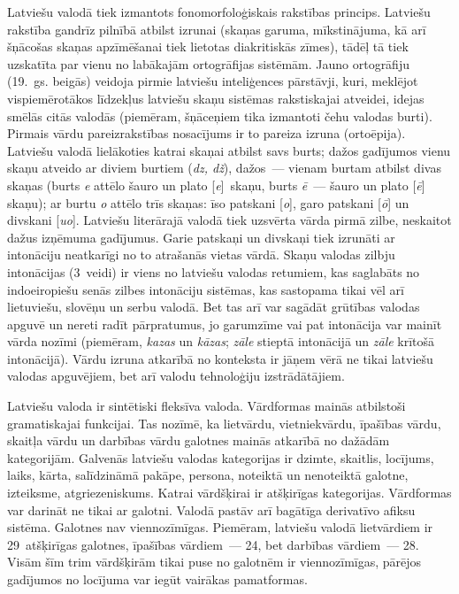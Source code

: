 \begin{multicols}{2}
Latviešu valodā tiek izmantots fonomorfoloģiskais rakstības princips.
Latviešu rakstība gandrīz pilnībā atbilst izrunai (skaņas garuma, mīkstinājuma, kā arī šņācošas skaņas apzīmēšanai tiek lietotas diakritiskās zīmes), tādēļ tā tiek uzskatīta par vienu no labākajām ortogrāfijas sistēmām.
Jauno ortogrāfiju (19.~gs. beigās) veidoja pirmie latviešu inteliģences pārstāvji, kuri, meklējot vispiemērotākos līdzekļus latviešu skaņu sistēmas rakstiskajai atveidei, idejas smēlās citās valodās (piemēram, šņāceņiem tika izmantoti čehu valodas burti).
Pirmais vārdu pareizrakstības nosacījums ir to pareiza izruna (ortoēpija).
Latviešu valodā lielākoties katrai skaņai atbilst savs burts; dažos gadījumos vienu skaņu atveido ar diviem burtiem (\textit{dz, dž}), dažos~--- vienam burtam atbilst divas skaņas (burts \textit{e} attēlo šauro un plato [\textit{e}]~skaņu, burts \textit{ē}~--- šauro un plato [\textit{ē}] skaņu); ar burtu \textit{o} attēlo trīs skaņas: īso patskani [\textit{o}], garo patskani [\textit{ō}] un divskani [\textit{uo}].
Latviešu literārajā valodā tiek uzsvērta vārda pirmā zilbe, neskaitot dažus izņēmuma gadījumus.
Garie patskaņi un divskaņi tiek izrunāti ar intonāciju neatkarīgi no to atrašanās vietas vārdā.
Skaņu valodas zilbju intonācijas (3~veidi) ir viens no latviešu valodas retumiem, kas saglabāts no indoeiropiešu senās zilbes intonāciju sistēmas, kas sastopama tikai vēl arī lietuviešu, slovēņu un serbu valodā.
Bet tas arī var sagādāt grūtības valodas apguvē un nereti radīt pārpratumus, jo garumzīme vai pat intonācija var mainīt vārda nozīmi (piemēram, \textit{kazas} un \textit{kāzas}; \textit{zāle} stieptā intonācijā un \textit{zāle} krītošā intonācijā).
Vārdu izruna atkarībā no konteksta ir jāņem vērā ne tikai latviešu valodas apguvējiem, bet arī valodu tehnoloģiju izstrādātājiem.


Latviešu valoda ir sintētiski fleksīva valoda.
Vārdformas mainās atbilstoši gramatiskajai funkcijai.
Tas nozīmē, ka lietvārdu, vietniekvārdu, īpašības vārdu, skaitļa vārdu un darbības vārdu galotnes mainās atkarībā no dažādām kategorijām.
Galvenās latviešu valodas kategorijas ir dzimte, skaitlis, locījums, laiks, kārta, salīdzināmā pakāpe, persona, noteiktā un nenoteiktā galotne, izteiksme, atgriezeniskums.
Katrai vārdšķirai ir atšķirīgas kategorijas.
Vārdformas var darināt ne tikai ar galotni.
Valodā pastāv arī bagātīga derivatīvo afiksu sistēma.
Galotnes nav viennozīmīgas.
Piemēram, latviešu valodā lietvārdiem ir 29~atšķirīgas galotnes, īpašības vārdiem~--- 24, bet darbības vārdiem~--- 28.
Visām šīm trim vārdšķirām tikai puse no galotnēm ir viennozīmīgas, pārējos gadījumos no locījuma var iegūt vairākas pamatformas.


\end{multicols}
